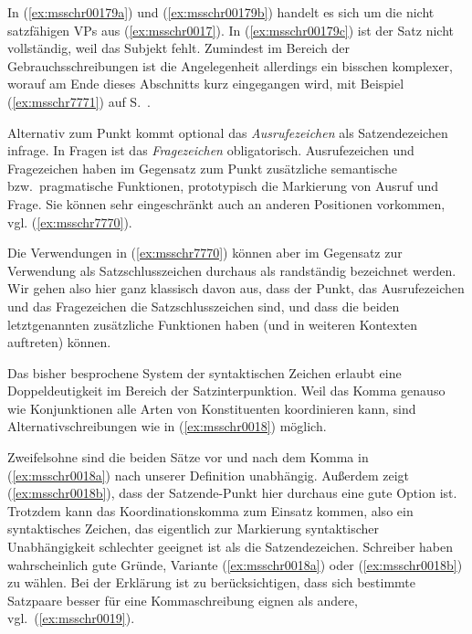 In (\ref{ex:msschr00179a}) und (\ref{ex:msschr00179b}) handelt es sich um die nicht satzfähigen VPs aus (\ref{ex:msschr0017}).
In (\ref{ex:msschr00179c}) ist der Satz nicht vollständig, weil das Subjekt fehlt.
Zumindest im Bereich der Gebrauchsschreibungen ist die Angelegenheit allerdings ein bisschen komplexer, worauf am Ende dieses Abschnitts kurz eingegangen wird, \zB mit Beispiel (\ref{ex:msschr7771}) auf S.~\pageref{ex:msschr7771}.

Alternativ zum Punkt kommt optional das \textit{Ausrufezeichen} als Satzendezeichen infrage.
In Fragen ist das \textit{Fragezeichen} obligatorisch.
Ausrufezeichen und Fragezeichen haben im Gegensatz zum Punkt zusätzliche semantische bzw.\ pragmatische Funktionen, prototypisch die Markierung von Ausruf und Frage.
Sie können sehr eingeschränkt auch an anderen Positionen vorkommen, vgl. (\ref{ex:msschr7770}).

\begin{exe}
  \ex\label{ex:msschr7770}
  \begin{xlist}
  \end{xlist}
\end{exe}

Die Verwendungen in (\ref{ex:msschr7770}) können aber im Gegensatz zur Verwendung als Satzschlusszeichen durchaus als randständig bezeichnet werden.
Wir gehen also hier ganz klassisch davon aus, dass der Punkt, das Ausrufezeichen und das Fragezeichen die Satzschlusszeichen sind, und dass die beiden letztgenannten zusätzliche Funktionen haben (und in weiteren Kontexten auftreten) können.

Das bisher besprochene System der syntaktischen Zeichen erlaubt eine Doppeldeutigkeit im Bereich der Satzinterpunktion.
Weil das Komma genauso wie Konjunktionen alle Arten von Konstituenten koordinieren kann, sind Alternativschreibungen wie in (\ref{ex:msschr0018}) möglich.

\begin{exe}
  \ex\label{ex:msschr0018} 
  \begin{xlist}
  \end{xlist}
\end{exe}

Zweifelsohne sind die beiden Sätze vor und nach dem Komma in (\ref{ex:msschr0018a}) nach unserer Definition unabhängig.
Außerdem zeigt (\ref{ex:msschr0018b}), dass der Satzende-Punkt hier durchaus eine gute Option ist.
Trotzdem kann das Koordinationskomma zum Einsatz kommen, also ein syntaktisches Zeichen, das eigentlich zur Markierung syntaktischer Unabhängigkeit schlechter geeignet ist als die Satzendezeichen.
Schreiber haben wahrscheinlich gute Gründe, Variante (\ref{ex:msschr0018a}) oder (\ref{ex:msschr0018b}) zu wählen.
Bei der Erklärung ist zu berücksichtigen, dass sich bestimmte Satzpaare besser für eine Kommaschreibung eignen als andere, vgl.\ (\ref{ex:msschr0019}).

